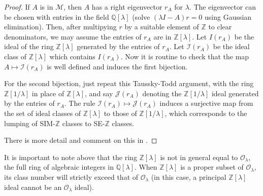 \documentclass{amsart}
\theoremstyle{definition}
\theoremstyle{definition}
\newcommand{\Z}{\mathbb Z}
\newcommand{\Q}{\mathbb Q}
\numberwithin{equation}{subsection}
\begin{document}
\begin{proof}
If $A$ is in $\mathcal M$, then $A$ has a right eigenvector $r_A$
for $\lambda$. The eigenvector can be
chosen with entries in the field $\Q [ \lambda ]$
(solve $(\lambda I- A)r=0$   using
Gaussian elimination). Then, after multipying $r$ by a suitable element
of $\Z$ to clear denominators, we may assume the entries of $r_A$
are in $\Z[\lambda ]$. Let $I(r_A)$ be the ideal of the ring $\Z[\lambda ]$
generated by the entries of $r_A$. Let $\mathcal I (r_A)$ be the
ideal class of $\Z[\lambda ]$ which contains $ I (r_A)$.
Now it is routine to check that the map $A\mapsto \mathcal I (r_A)$
is well defined and   induces the first bijection.


For the second bijection, just repeat this Taussky-Todd argument,
with the ring $\Z[1/\lambda ]$ in place of $\Z [\lambda ]$,
and say $\mathcal J(r_A)$ denoting the $\Z[1/\lambda ]$ ideal
generated by the entries of $r_A$. The rule $\mathcal I(r_A)\mapsto
\mathcal J(r_A)$ induces a surjective map from the set of
ideal classes of $\Z[ \lambda ]$
to those of $\Z[ 1/\lambda ]$, which corresponds to the
lumping of SIM-$\Z$ classes to SE-$\Z$ classes.

There is more detail and comment on this in \cite{BMT1987}.
\end{proof}


It is important to note above that the ring $\Z [\lambda]$
is not in general equal to  $\mathcal O_{\lambda}$, the full ring of
algebraic integers in $\Q [\lambda ]$. When
$\Z [\lambda]$ is a proper subset of
$\mathcal O_{\lambda}$, its class number will strictly exceed that of
$\mathcal O_{\lambda}$
(in this case, a principal $\Z[\lambda ]$ ideal cannot be an
$\mathcal O_{\lambda}$  ideal).
\end{document}
